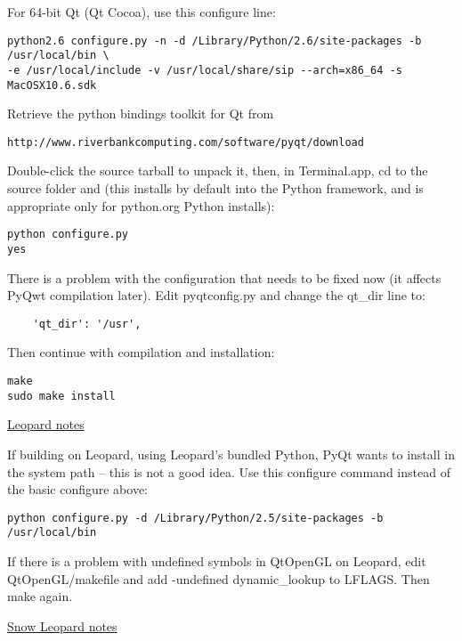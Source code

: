For 64-bit Qt (Qt Cocoa), use this configure line:

\begin{verbatim}
python2.6 configure.py -n -d /Library/Python/2.6/site-packages -b /usr/local/bin \
-e /usr/local/include -v /usr/local/share/sip --arch=x86_64 -s MacOSX10.6.sdk
\end{verbatim}

\hypertarget{toc30}{}
Retrieve the python bindings toolkit for Qt from

\begin{verbatim}
http://www.riverbankcomputing.com/software/pyqt/download
\end{verbatim}

Double-click the source tarball to unpack it, then, in Terminal.app, cd to the source folder
and (this installs by default into the Python framework, and is appropriate only for python.org Python installs):

\begin{verbatim}
python configure.py 
yes 
\end{verbatim}

There is a problem with the configuration that needs to be fixed now (it affects PyQwt compilation later).  Edit pyqtconfig.py and change the qt\_dir line to:

\begin{verbatim}
    'qt_dir': '/usr',
\end{verbatim}

Then continue with compilation and installation:

\begin{verbatim}
make 
sudo make install 
\end{verbatim}

\underline{Leopard notes}

If building on Leopard, using Leopard's bundled Python, PyQt wants to install
in the system path -- this is not a good idea.  Use this configure command
instead of the basic configure above:

\begin{verbatim}
python configure.py -d /Library/Python/2.5/site-packages -b /usr/local/bin
\end{verbatim}

If there is a problem with undefined symbols in QtOpenGL on Leopard, edit
QtOpenGL/makefile and add -undefined dynamic\_lookup to LFLAGS.
Then make again.

\underline{Snow Leopard notes}

